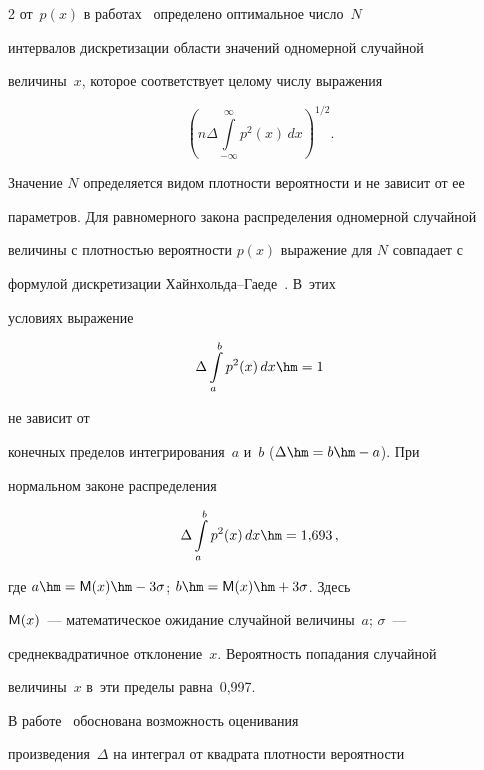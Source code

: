 \begin{multicols}{2}
от~$p(x)$ в работах~\cite{10-l, 13-l} определено оптимальное число~$N$ 


интервалов дискретизации об\-ласти значений одномерной случайной 


величины~$x$, которое соответствует целому числу вы\-ра\-жения


\begin{equation}


 \left( n\Delta \int\limits_{-\infty}^\infty p^2(x)\,dx\right)^{1/2}.


 \label{e4-l}


\end{equation}


  


  Значение $N$ определяется видом плотности вероятности и не зависит от ее 


параметров. Для равномерного закона распределения одномерной случайной 


величины с плотностью вероятности $p(x)$ выражение для $N$ совпадает с 


формулой дискретизации Хайн\-холь\-да--Га\-е\-де~\cite{15-l}. В~этих 


условиях выражение 


$$


\Delta \int\limits_a^b p^2(x)\,dx\hm=1


$$


 не зависит от 


конечных пределов интегрирования~$a$ и~$b$ ($\Delta\hm= b\hm-a$). При 


нормальном законе распределения 


$$


\Delta \int\limits_a^b p^2(x)\,dx\hm= 


1{,}693\,,


$$


 где $a\hm= {\sf M}(x)\hm-3\sigma$; $b\hm= {\sf M}(x)\hm+3\sigma$. Здесь 


${\sf M}(x)$~--- математическое ожидание случайной величины~$a$; $\sigma$~--- 


среднеквадратичное отклонение~$x$. Вероятность попадания случайной 


величины~$x$ в~эти пределы равна~0,997.


  


  В работе~\cite{10-l} обоснована возможность оценивания 


произведения~$\Delta$ на интеграл от квадрата плотности вероятности 



\end{multicols}

